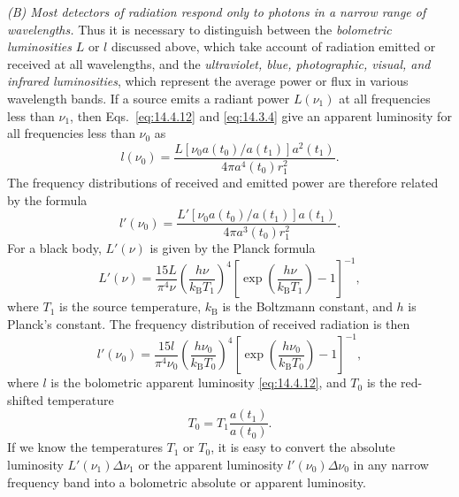 \medskip
\noindent\textit{(B) Most detectors of radiation respond only to photons in
a narrow range of wavelengths.}
Thus it is necessary to distinguish between the \emph{bolometric
luminosities} \(L\) or \(l\) discussed above, which take account of
radiation emitted or received at all wavelengths, and the
\emph{ultraviolet, blue, photographic, visual, and infrared luminosities},
which represent the average power or flux in various wavelength bands. If a
source emits a radiant power \(L(\nu_1)\) at all frequencies less than
\(\nu_1\), then Eqs.~\eqref{eq:14.4.12} and \eqref{eq:14.3.4} give an
apparent luminosity for all frequencies less than \(\nu_0\) as
\begin{equation}
  l(\nu_0)
  =
  \frac{
    L\!\left[\nu_0a(t_0)/a(t_1)\right]a^2(t_1)
  }{
    4\pi a^4(t_0)r_1^2
  }.
  \tag{14.4.34}\label{eq:14.4.34}
\end{equation}
The frequency distributions of received and emitted power are therefore
related by the formula
\begin{equation}
  l'(\nu_0)
  =
  \frac{
    L'\!\left[\nu_0a(t_0)/a(t_1)\right]a(t_1)
  }{
    4\pi a^3(t_0)r_1^2
  }.
  \tag{14.4.35}\label{eq:14.4.35}
\end{equation}
For a black body, \(L'(\nu)\) is given by the Planck formula
\begin{equation}
  L'(\nu)
  =
  \frac{15L}{\pi^4\nu}
  \left(\frac{h\nu}{k_{\mathrm B}T_1}\right)^4
  \left[
    \exp\!\left(\frac{h\nu}{k_{\mathrm B}T_1}\right)-1
  \right]^{-1},
  \tag{14.4.36}\label{eq:14.4.36}
\end{equation}
where \(T_1\) is the source temperature, \(k_{\mathrm B}\) is the Boltzmann
constant, and \(h\) is Planck's constant. The frequency distribution of
received radiation is then
\begin{equation}
  l'(\nu_0)
  =
  \frac{15l}{\pi^4\nu_0}
  \left(\frac{h\nu_0}{k_{\mathrm B}T_0}\right)^4
  \left[
    \exp\!\left(\frac{h\nu_0}{k_{\mathrm B}T_0}\right)-1
  \right]^{-1},
  \tag{14.4.37}\label{eq:14.4.37}
\end{equation}
where \(l\) is the bolometric apparent luminosity \eqref{eq:14.4.12}, and
\(T_0\) is the red-shifted temperature
\begin{equation}
  T_0=T_1\frac{a(t_1)}{a(t_0)}.
  \tag{14.4.38}\label{eq:14.4.38}
\end{equation}
If we know the temperatures \(T_1\) or \(T_0\), it is easy to convert the
absolute luminosity \(L'(\nu_1)\Delta\nu_1\) or the apparent luminosity
\(l'(\nu_0)\Delta\nu_0\) in any narrow frequency band into a bolometric
absolute or apparent luminosity.

